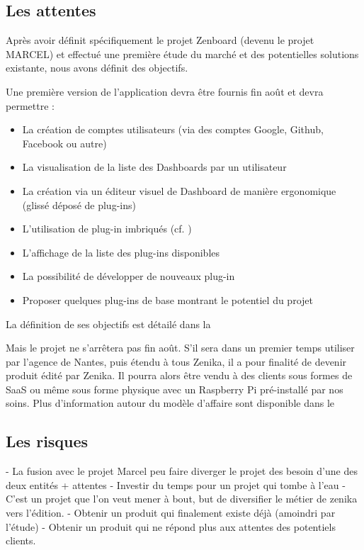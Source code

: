 \subsection{Les attentes}

Après avoir définit spécifiquement le projet Zenboard (devenu le projet MARCEL) et effectué une première étude du marché et des potentielles solutions existante, nous avons définit des objectifs.

Une première version de l'application devra être fournis fin août et devra permettre :

\begin{itemize}
	\item{La création de comptes utilisateurs (via des comptes Google, Github, Facebook ou autre)}
    \item{La visualisation de la liste des Dashboards par un utilisateur}
    \item{La création via un éditeur visuel de Dashboard de manière ergonomique (glissé déposé de plug-ins)}
    \item{L'utilisation de plug-in imbriqués (cf. \textit{})}
    \item{L'affichage de la liste des plug-ins disponibles}
    \item{La possibilité de développer de nouveaux plug-in}
    \item{Proposer quelques plug-ins de base montrant le potentiel du projet}
\end{itemize}

La définition de ses objectifs est détailé dans la 

Mais le projet ne s'arrêtera pas fin août. S'il sera dans un premier temps utiliser par l'agence de Nantes, puis étendu à tous Zenika, il a pour finalité de devenir produit édité par Zenika. Il pourra alors être vendu à des clients sous formes de \gls{SaaS} ou même sous forme physique avec un Raspberry Pi pré-installé par nos soins. Plus d'information autour du modèle d'affaire sont disponible dans le 

\subsection{Les risques}

  - La fusion avec le projet Marcel peu faire diverger le projet des besoin d'une des deux entités + attentes
  - Investir du temps pour un projet qui tombe à l'eau
  - C'est un projet que l'on veut mener à bout, but de diversifier le métier de zenika vers l'édition.
  - Obtenir un produit qui finalement existe déjà (amoindri par l'étude)
  - Obtenir un produit qui ne répond plus aux attentes des potentiels clients.
  
